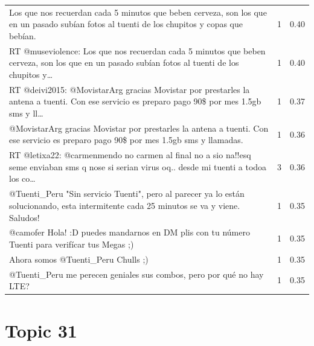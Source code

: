 \begin{longtable}{p{12.5cm}rr}
Los que nos recuerdan cada 5 minutos que beben cerveza, son los que en un pasado subían fotos al tuenti de los chupitos y copas que bebían. & 1 & 0.40 \\
RT @museviolence: Los que nos recuerdan cada 5 minutos que beben cerveza, son los que en un pasado subían fotos al tuenti de los chupitos y… & 1 & 0.40 \\
RT @deivi2015: @MovistarArg gracias Movistar por prestarles la antena a tuenti. Con ese servicio es preparo pago 90\$ por mes 1.5gb sms y ll… & 1 & 0.37 \\
@MovistarArg gracias Movistar por prestarles la antena a tuenti. Con ese servicio es preparo pago 90\$ por mes 1.5gb sms y llamadas. & 1 & 0.36 \\
RT @letixa22: @carmenmendo no carmen al final no a sio na!!esq seme enviaban sms q nose si serian virus oq.. desde mi tuenti a todoa los co… & 3 & 0.36 \\
@Tuenti\_Peru "Sin servicio Tuenti", pero al parecer ya lo están solucionando, esta intermitente cada 25 minutos se va y viene. Saludos! & 1 & 0.35 \\
@camofer  Hola! :D puedes mandarnos en DM plis con tu número Tuenti para verifícar  tus Megas ;) & 1 & 0.35 \\
Ahora somos @Tuenti\_Peru  Chulls ;) & 1 & 0.35 \\
@Tuenti\_Peru me perecen geniales sus combos, pero por qué no hay LTE? & 1 & 0.35 \\

\end{longtable}
\clearpage

\section{Topic 31}

